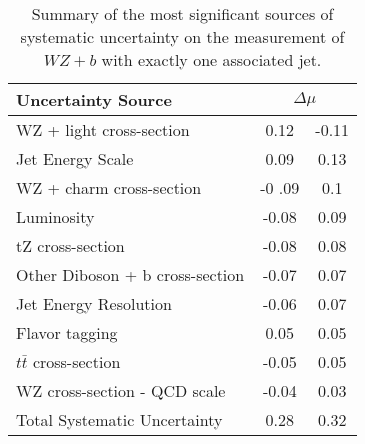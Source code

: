 \begin{table}[H]
    \centering
    \begin{tabular}{l|cc}
        \hline\hline
        Uncertainty Source & \multicolumn{2}{c}{$\Delta \mu$ }  \\
        \hline
        WZ + light cross-section & 0.12 & -0.11 \\
        Jet Energy Scale & 0.09 & 0.13 \\
        WZ + charm cross-section & -0 .09 & 0.1 \\
        Luminosity & -0.08 & 0.09 \\
        tZ cross-section & -0.08 & 0.08 \\
        Other Diboson + b cross-section & -0.07 & 0.07 \\
        Jet Energy Resolution & -0.06 & 0.07 \\
        Flavor tagging & 0.05 & 0.05 \\
        $t\bar{t}$ cross-section & -0.05 & 0.05 \\
        WZ cross-section - QCD scale & -0.04 & 0.03 \\
        \hline
        Total Systematic Uncertainty & 0.28 & 0.32 \\
        
        \hline\hline
    \end{tabular}
    \caption{Summary of the most significant sources of systematic uncertainty on the measurement of $WZ+b$ with exactly one associated jet.}
    \label{tab:systematics_1j}
\end{table}

